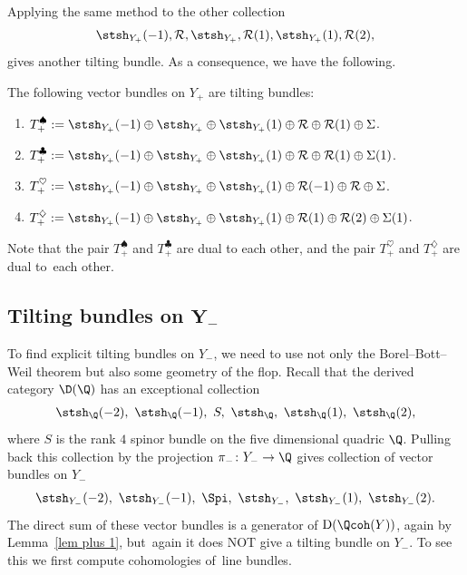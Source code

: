 Applying the same method to the other collection
\begin{gather*}
\stsh_{Y_+}(-1), \mathcal{R}, \stsh_{Y_+}, \mathcal{R}(1), \stsh_{Y_+}(1), \mathcal{R}(2),
\end{gather*}
gives another tilting bundle.
As a consequence, we have the following.

\begin{Theorem}
The following vector bundles on $Y_+$ are tilting bundles:
\begin{enumerate}\itemsep=0pt
\item[$1.$] $T_+^{\spadesuit} := \stsh_{Y_+}(-1) \oplus \stsh_{Y_+} \oplus \stsh_{Y_+}(1) \oplus \mathcal{R} \oplus \mathcal{R}(1) \oplus \Sigma$.
\item[$2.$] $T_+^{\clubsuit} := \stsh_{Y_+}(-1) \oplus \stsh_{Y_+} \oplus \stsh_{Y_+}(1) \oplus \mathcal{R} \oplus \mathcal{R}(1) \oplus \Sigma(1)$.
\item[$3.$] $T_+^{\heartsuit} := \stsh_{Y_+}(-1) \oplus \stsh_{Y_+} \oplus \stsh_{Y_+}(1) \oplus \mathcal{R}(-1) \oplus \mathcal{R} \oplus \Sigma$.
\item[$4.$] $T_+^{\diamondsuit} := \stsh_{Y_+}(-1) \oplus \stsh_{Y_+} \oplus \stsh_{Y_+}(1) \oplus \mathcal{R}(1) \oplus \mathcal{R}(2) \oplus \Sigma(1)$.
\end{enumerate}
\end{Theorem}

Note that the pair $T_+^{\spadesuit}$ and $T_+^{\clubsuit}$ are dual to each other,
and the pair $T_+^{\heartsuit}$ and $T_+^{\diamondsuit}$ are dual to~each other.


\subsection[Tilting bundles on Y-]{Tilting bundles on $\boldsymbol{Y_-}$}
To find explicit tilting bundles on $Y_-$, we need to use not only the Borel--Bott--Weil theorem but also some geometry of the flop.
Recall that the derived category $\D(\Q)$ has an exceptional collection
\begin{gather*}
\stsh_{\Q}(-2),\ \stsh_{\Q}(-1),\ S,\ \stsh_{\Q},\ \stsh_{\Q}(1),\ \stsh_{\Q}(2),
\end{gather*}
where $S$ is the rank $4$ spinor bundle on the five dimensional quadric $\Q$.
Pulling back this collection by the projection $\pi_-\colon Y_- \to \Q$ gives collection of vector bundles on $Y_-$
\begin{gather*}
\stsh_{Y_-}(-2),\ \stsh_{Y_-}(-1),\ \Spi,\ \stsh_{Y_-},\ \stsh_{Y_-}(1),\ \stsh_{Y_-}(2).
\end{gather*}
The direct sum of these vector bundles is a generator of $\mathrm{D}(\Qcoh(Y))$, again by Lemma~\ref{lem plus 1},
but~again it does NOT give a tilting bundle on $Y_-$.
To see this we first compute cohomologies of~line bundles.


